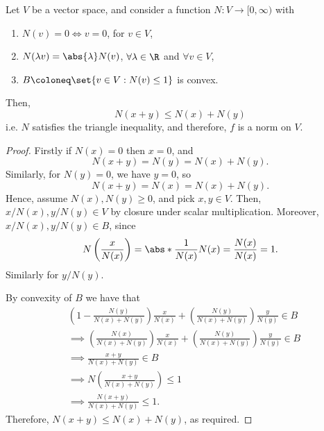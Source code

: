 \documentclass[draft]{penrose}
\begin{document}
\begin{nthm}
\label{thm:norm-convex-triangle}
  Let $V$ be a vector space, and consider a function $N : V \to [0,\infty)$ with
  \begin{enumerate}
  \item $N(v) = 0 \iff v =0$, for $v \in V$,
  \item $N(\lambda v) = \abs{\lambda}N(v)$, $\forall \lambda \in \R$ and $\forall v \in V$,
  \item $B \coloneq \set{v \in V : N(v) \leq 1}$ is convex.
  \end{enumerate}
  Then,
  \begin{equation*}
    N(x+y) \leq N(x) + N(y)
  \end{equation*}
  i.e. $N$ satisfies the triangle inequality, and therefore, $f$ is a norm on $V$.
\end{nthm}
\begin{proof}
  Firstly if $N(x)=0$ then $x=0$, and
  \begin{equation*}
    N(x+y) = N(y) = N(x) + N(y).
  \end{equation*}
  Similarly, for $N(y)=0$, we have $y=0$, so
  \begin{equation*}
    N(x+y) = N(x) = N(x) + N(y).
  \end{equation*}
  Hence, assume $N(x), N(y) \geq 0$, and pick $x, y \in V$. Then, $x/N(x), y/N(y) \in V$ by closure under scalar multiplication. Moreover, $x/N(x), y/N(y) \in B$, since
  \begin{equation*}
    N\left(\frac{x}{N(x)}\right) = \abs*{\frac{1}{N(x)}}N(x) = \frac{N(x)}{N(x)} = 1.
  \end{equation*}
  Similarly for $y/N(y)$.

  By convexity of $B$ we have that
  \begin{align*}
  &\left(1 - \frac{N(y)}{N(x)+N(y)}\right)\frac{x}{N(x)} + \left(\frac{N(y)}{N(x)+N(y)}\right)\frac{y}{N(y)} \in B\\
  &\implies \left(\frac{N(x)}{N(x)+N(y)}\right)\frac{x}{N(x)} + \left(\frac{N(y)}{N(x)+N(y)}\right)\frac{y}{N(y)} \in B\\
  &\implies \frac{x+y}{N(x)+N(y)} \in B\\
  &\implies N\left(\frac{x+y}{N(x)+N(y)}\right) \leq 1\\
  &\implies \frac{N(x+y)}{N(x)+N(y)} \leq 1.
  \end{align*}
  Therefore, $N(x+y) \leq N(x) + N(y)$, as required.
\end{proof}
\end{document}
